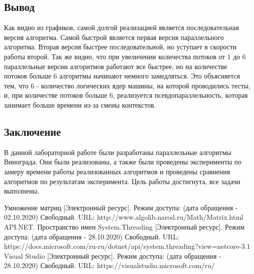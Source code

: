 \documentclass{article}
\begin{document}
	\subsection{Вывод}
	Как видно из графиков, самой долгой реализацией является последовательная версия алгоритма. 
	Самой быстрой является первая версия параллельного алгоритма. Вторая версия быстрее 
	последовательной, но уступает в скорости работы второй.
	\newline
	\indent Так же видно, что при увеличении количества потоков от 1 до 6 параллельные версии алгоритмов работают все быстрее, но на количестве потоков больше 6 алгоритмы начинают немного замедляться. Это объясняется тем, что 6 - количество логических ядер машины, на которой проводились тесты, и, при количестве потоков больше 6, реализуется псевдопараллельность, которая занимает больше времени из-за смены контекстов.

	\newpage
	\begin{center}
		\section*{Заключение}
	\end{center}
	\indent \indent В данной лабораторной работе были разработаны параллельные алгоритмы Винограда. Они были реализованы, а также были проведены эксперименты по замеру времени работы реализованных алгоритмов и проведены сравнения алгоритмов по результатам эксперимента. Цель работы достигнута, все задачи выполнены.
	\newpage
	
	\begin{center}
	\begin{thebibliography}{3}
	Умножение матриц [Электронный ресурс]. Режим доступа: (дата обращения - 02.10.2020) Свободный. URL: http://www.algolib.narod.ru/Math/Matrix.html
	API.NET. Пространство имен System.Threading [Электронный ресурс]. Режим доступа: (дата обращения - 28.10.2020) Свободный. URL: https://docs.microsoft.com/ru-ru/dotnet/api/system.threading?view=netcore-3.1
	Visual Studio [Электронный ресурс]. Режим доступа: (дата обращения - 28.10.2020) Свободный. URL: https://visualstudio.microsoft.com/ru/

	\end{thebibliography}
	\end{center}
\end{document}
